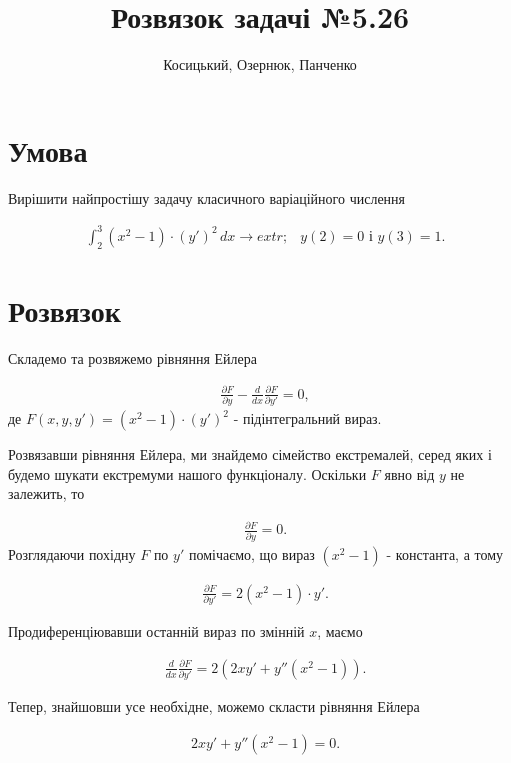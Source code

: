 \documentclass[12pt]{article}
\title{Розв\textquotesingle язок задачі №5.26}
\author{Косицький, Озернюк, Панченко}
\begin{document}
\maketitle

\section*{Умова}

Вирішити найпростішу задачу класичного варіаційного числення

\begin{align*}
  & \int_{2}^{3} (x^2 - 1)\cdot (y')^2 \,dx \rightarrow extr; & y(2) = 0 \text{        і        } y(3) = 1.
\end{align*}

\section*{Розв\textquotesingle язок}

Складемо та розв\textquotesingle яжемо рівняння Ейлера

\begin{align*}
  & \frac{\partial F}{\partial y} - \frac{d}{dx}\frac{\partial F}{\partial y'} = 0,
\end{align*}
 де $F(x, y, y') = (x^2 - 1)\cdot (y')^2$ - підінтегральний вираз.

Розв\textquotesingle язавши рівняння Ейлера, ми знайдемо сімейство екстремалей, серед яких і будемо шукати екстремуми нашого функціоналу.
Оскільки $F$ явно від $y$ не залежить, то

\begin{align*}
  & \frac{\partial F}{\partial y} = 0.
\end{align*}
Розглядаючи похідну $F$ по $y'$ помічаємо, що вираз $(x^2 - 1)$ - константа, а тому

\begin{align*}
  & \frac{\partial F}{\partial y'} = 2(x^2 - 1)\cdot y'.
\end{align*}

Продиференціювавши останній вираз по змінній $x$, маємо

\begin{align*}
  & \frac{d}{dx}\frac{\partial F}{\partial y'} = 2(2xy' + y''(x^2 - 1)).
\end{align*}

Тепер, знайшовши усе необхідне, можемо скласти рівняння Ейлера

\begin{align*}
  & 2xy' + y''(x^2 - 1) = 0.
\end{align*}
\end{document}

